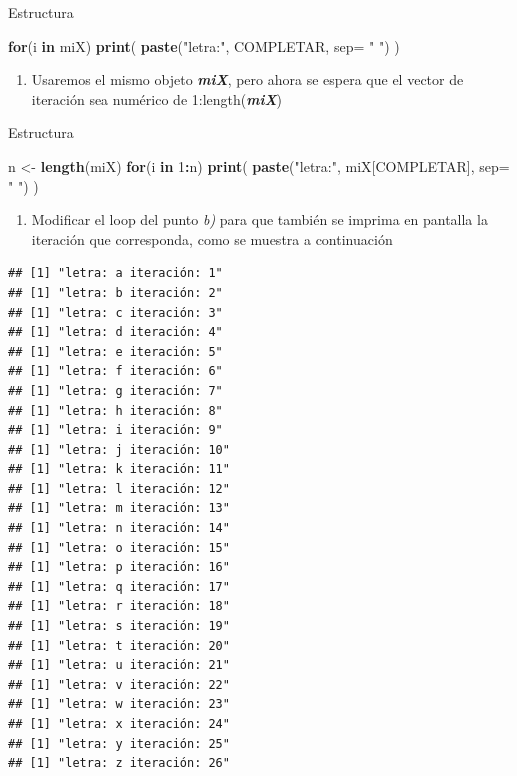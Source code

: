 \documentclass[]{book}
\newenvironment{Shaded}{\begin{snugshade}}{\end{snugshade}}
\newcommand{\ControlFlowTok}[1]{\textcolor[rgb]{0.13,0.29,0.53}{\textbf{#1}}}
\newcommand{\DataTypeTok}[1]{\textcolor[rgb]{0.13,0.29,0.53}{#1}}
\newcommand{\DecValTok}[1]{\textcolor[rgb]{0.00,0.00,0.81}{#1}}
\newcommand{\KeywordTok}[1]{\textcolor[rgb]{0.13,0.29,0.53}{\textbf{#1}}}
\newcommand{\NormalTok}[1]{#1}
\newcommand{\OperatorTok}[1]{\textcolor[rgb]{0.81,0.36,0.00}{\textbf{#1}}}
\newcommand{\StringTok}[1]{\textcolor[rgb]{0.31,0.60,0.02}{#1}}
\providecommand{\tightlist}{%
  \setlength{\itemsep}{0pt}\setlength{\parskip}{0pt}}
\begin{document}
Estructura

\begin{Shaded}
\begin{Highlighting}[]
\ControlFlowTok{for}\NormalTok{(i }\ControlFlowTok{in}\NormalTok{ miX)  }\KeywordTok{print}\NormalTok{( }\KeywordTok{paste}\NormalTok{(}\StringTok{"letra:"}\NormalTok{, COMPLETAR, }\DataTypeTok{sep=} \StringTok{" "}\NormalTok{) )}
\end{Highlighting}
\end{Shaded}

\begin{enumerate}
\def\labelenumi{\alph{enumi})}
\setcounter{enumi}{1}
\tightlist
\item
  Usaremos el mismo objeto \textbf{\emph{miX}}, pero ahora se espera que el vector de iteración sea numérico de 1:length(\textbf{\emph{miX}})
\end{enumerate}

Estructura

\begin{Shaded}
\begin{Highlighting}[]
\NormalTok{n <-}\StringTok{ }\KeywordTok{length}\NormalTok{(miX)}
\ControlFlowTok{for}\NormalTok{(i }\ControlFlowTok{in} \DecValTok{1}\OperatorTok{:}\NormalTok{n)  }\KeywordTok{print}\NormalTok{( }\KeywordTok{paste}\NormalTok{(}\StringTok{"letra:"}\NormalTok{, miX[COMPLETAR], }\DataTypeTok{sep=} \StringTok{" "}\NormalTok{) )}
\end{Highlighting}
\end{Shaded}

\begin{enumerate}
\def\labelenumi{\alph{enumi})}
\setcounter{enumi}{2}
\tightlist
\item
  Modificar el loop del punto \emph{b)} para que también se imprima en pantalla la iteración que corresponda, como se muestra a continuación
\end{enumerate}

\begin{verbatim}
## [1] "letra: a iteración: 1"
## [1] "letra: b iteración: 2"
## [1] "letra: c iteración: 3"
## [1] "letra: d iteración: 4"
## [1] "letra: e iteración: 5"
## [1] "letra: f iteración: 6"
## [1] "letra: g iteración: 7"
## [1] "letra: h iteración: 8"
## [1] "letra: i iteración: 9"
## [1] "letra: j iteración: 10"
## [1] "letra: k iteración: 11"
## [1] "letra: l iteración: 12"
## [1] "letra: m iteración: 13"
## [1] "letra: n iteración: 14"
## [1] "letra: o iteración: 15"
## [1] "letra: p iteración: 16"
## [1] "letra: q iteración: 17"
## [1] "letra: r iteración: 18"
## [1] "letra: s iteración: 19"
## [1] "letra: t iteración: 20"
## [1] "letra: u iteración: 21"
## [1] "letra: v iteración: 22"
## [1] "letra: w iteración: 23"
## [1] "letra: x iteración: 24"
## [1] "letra: y iteración: 25"
## [1] "letra: z iteración: 26"
\end{verbatim}
\end{document}

